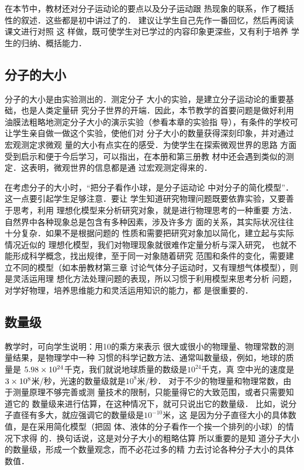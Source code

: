 在本节中，教材还对分子运动论的要点以及分子运动跟
热现象的联系，作了概括性的叙述．这些都是初中讲过了的．
建议让学生自己先作一番回忆，然后再阅读课文进行对照 这
样做，既可使学生对已学过的内容印象更深些，又有利于培养
学生的归纳、概括能力．

\subsection{分子的大小} 分子的大小是由实验测出的．测定分子
大小的实验，是建立分子运动论的重要基础，也是人类定量研
究分子世界的开端．因此，本节教学的首要问题是做好利用
油膜法粗略地测定分子大小的演示实验（参看本章的实验指
导），有条件的学校可让学生亲自做一做这个实验，使他们对
分子大小的数量获得深刻印象，并对通过宏观测定求微观
量的大小有点实在的感受．为使学生在探索微观世界的思路
方面受到启示和便于今后学习，可以指出，在本册和第三册教
材中还会遇到类似的测定．这表明，微观世界的信息都是通
过宏观测定得来的．

在考虑分子的大小时，“把分子看作小球，是分子运动论
中对分子的简化模型”．这一点要引起学生足够注意．要让
学生知道研究物理问题既要依靠实验，又要善于思考，利用
理想化模型来分析研究对象，就是进行物理思考的一种重要
方法．自然界中各种现象总是包含有多种因素，涉及许多方
面的关系，其实际状况往往十分复杂．如果不是根据问题的
性质和需要把研究对象加以简化，建立起与实际情况近似的
理想化模型，我们对物理现象就很难作定量分析与深入研究，
也就不能形成科学概念，找出规律，至于同一对象随着研究
范围和条件的变化，需要建立不同的模型（如本册教材第三章
讨论气体分子运动时，又有理想气体模型），则是灵活运用理
想化方法处理问题的表现，所以习惯于利用模型来思考分析
问题，对学好物理，培养思维能力和灵活运用知识的能力，都
是很重要的．

\subsection{数量级}
教学时，可向学生说明：用10的乘方来表示
很大或很小的物理量、物理常数的测量结果，是物理学中一种
习惯的科学记数方法、通常叫数量级，例如，地球的质量是
$5.98\times10^{24}$千克，我们就说地球质量的数级是$10^{24}$千克，真
空中光的速度是$3\times10^8$米/秒，光速的数量级就是$10^8$米/秒．
对于不少的物理量和物理常数，由于测量原理不够完善或测
量技术的限制，只能量得它的大致范围，或者只需要知道它的
数量级来进行估算，在这种情况下，就可只说出它的数量级．
比如，说分子直径有多大，就应强调它的数量级是$10^{-10}$米，这
是因为分子直径大小的具体数值，是在采用简化模型（把固
体、液体的分子看作一个挨一个排列的小球）的情况下求得
的．换句话说，这是对分子大小的粗略估算 所以重要的是知
道分子大小的数量级，形成一个数量观念，而不必花过多的精
力去讨论各种分子大小的具体数值．

